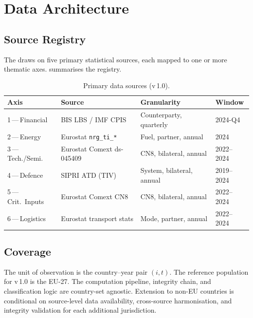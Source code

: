 \section{Data Architecture}\label{sec:data-architecture}

\subsection{Source Registry}\label{sec:data:sources}

The \ISI draws on five primary statistical sources, each mapped to one or
more thematic axes.   summarises the registry.

\begin{table}[htbp]
  \centering\small
  \caption{Primary data sources (v\,1.0).}\label{tab:source-registry}
  \begin{tabularx}{\textwidth}{@{}l l l X@{}}
    \toprule
    \textbf{Axis} & \textbf{Source} & \textbf{Granularity}
      & \textbf{Window} \\
    \midrule
    1\,---\,Financial   & BIS LBS / IMF CPIS
      & Counterparty, quarterly   & 2024-Q4 \\
    2\,---\,Energy      & Eurostat \texttt{nrg\_ti\_*}
      & Fuel, partner, annual     & 2024 \\
    3\,---\,Tech./Semi. & Eurostat Comext ds-045409
      & CN8, bilateral, annual    & 2022--2024 \\
    4\,---\,Defence     & SIPRI ATD (TIV)
      & System, bilateral, annual & 2019--2024 \\
    5\,---\,Crit.\ Inputs & Eurostat Comext CN8
      & CN8, bilateral, annual    & 2022--2024 \\
    6\,---\,Logistics   & Eurostat transport stats
      & Mode, partner, annual     & 2022--2024 \\
    \bottomrule
  \end{tabularx}
\end{table}

\subsection{Coverage}\label{sec:data:coverage}

The unit of observation is the country--year pair \((i, t)\).  The reference
population for \ISI v\,1.0 is the EU-27.  The computation pipeline, integrity
chain, and classification logic are country-set agnostic.  Extension to non-EU
countries is conditional on source-level data availability, cross-source
harmonisation, and integrity validation for each additional jurisdiction.

